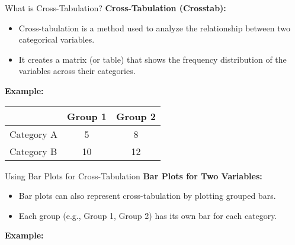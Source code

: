 \documentclass[handout]{beamer} %
\begin{document}
\begin{frame}{What is Cross-Tabulation?}
    \textbf{Cross-Tabulation (Crosstab):}
    \begin{itemize}
        \item Cross-tabulation is a method used to analyze the relationship between two categorical variables.
        \item It creates a matrix (or table) that shows the frequency distribution of the variables across their categories.
    \end{itemize}
    
    \vspace{0.5cm}
    \textbf{Example:}
    \begin{center}
        \begin{tabular}{lcc}
            \toprule
            & \textbf{Group 1} & \textbf{Group 2} \\
            \midrule
            Category A & 5 & 8 \\
            Category B & 10 & 12 \\
            \bottomrule
        \end{tabular}
    \end{center}
\end{frame}

\begin{frame}{Using Bar Plots for Cross-Tabulation}
    \textbf{Bar Plots for Two Variables:}
    \begin{itemize}
        \item Bar plots can also represent cross-tabulation by plotting grouped bars.
        \item Each group (e.g., Group 1, Group 2) has its own bar for each category.
    \end{itemize}
    
    \textbf{Example:}
    \begin{center}
    \end{center}

\end{frame}
\end{document}
